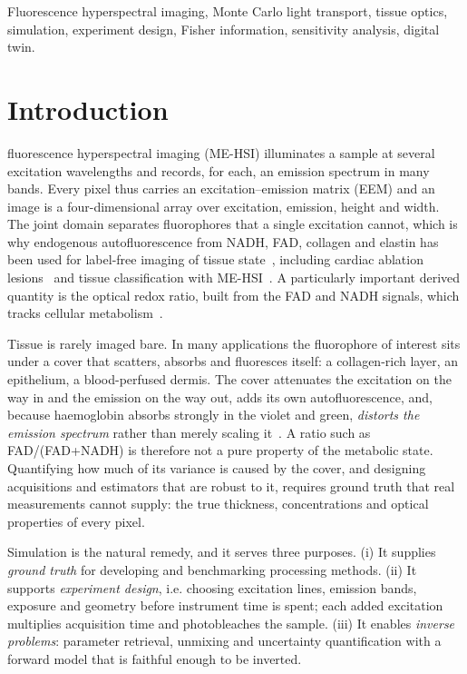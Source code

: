 \documentclass[journal]{IEEEtran}
\begin{document}
\begin{IEEEkeywords}
Fluorescence hyperspectral imaging, Monte Carlo light transport, tissue optics, simulation, experiment design, Fisher information, sensitivity analysis, digital twin.
\end{IEEEkeywords}

\section{Introduction}
 fluorescence hyperspectral imaging (ME-HSI) illuminates a sample at several excitation wavelengths and records, for each, an emission spectrum in many bands. Every pixel thus carries an excitation--emission matrix (EEM) and an image is a four-dimensional array over excitation, emission, height and width. The joint domain separates fluorophores that a single excitation cannot, which is why endogenous autofluorescence from NADH, FAD, collagen and elastin has been used for label-free imaging of tissue state~\cite{zipfel2003,georgakoudi2012,croce2014,ramanujam2000}, including cardiac ablation lesions~\cite{mercader2012,gil2017,guan2018} and tissue classification with ME-HSI~\cite{chil4d2025,chillichen2025,hunanyan2025}. A particularly important derived quantity is the optical redox ratio, built from the FAD and NADH signals, which tracks cellular metabolism~\cite{skala2007,georgakoudi2012}.

Tissue is rarely imaged bare. In many applications the fluorophore of interest sits under a cover that scatters, absorbs and fluoresces itself: a collagen-rich layer, an epithelium, a blood-perfused dermis. The cover attenuates the excitation on the way in and the emission on the way out, adds its own autofluorescence, and, because haemoglobin absorbs strongly in the violet and green, \emph{distorts the emission spectrum} rather than merely scaling it~\cite{wu1993,muller2001}. A ratio such as FAD/(FAD+NADH) is therefore not a pure property of the metabolic state. Quantifying how much of its variance is caused by the cover, and designing acquisitions and estimators that are robust to it, requires ground truth that real measurements cannot supply: the true thickness, concentrations and optical properties of every pixel.

Simulation is the natural remedy, and it serves three purposes. (i) It supplies \emph{ground truth} for developing and benchmarking processing methods. (ii) It supports \emph{experiment design}, i.e. choosing excitation lines, emission bands, exposure and geometry before instrument time is spent; each added excitation multiplies acquisition time and photobleaches the sample. (iii) It enables \emph{inverse problems}: parameter retrieval, unmixing and uncertainty quantification with a forward model that is faithful enough to be inverted.
\end{document}
